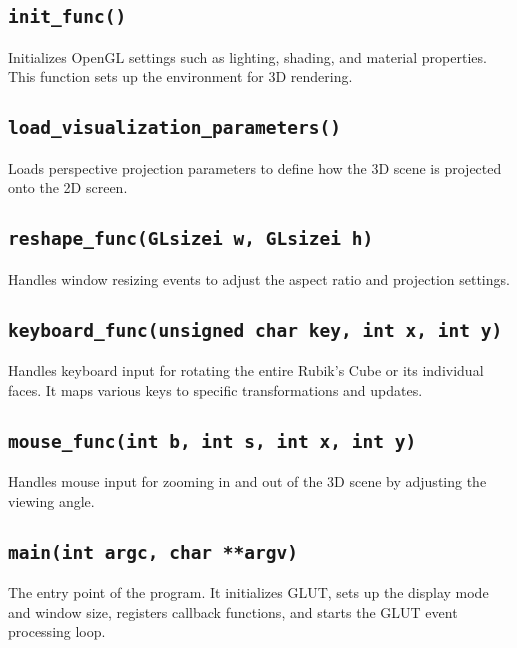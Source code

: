 \documentclass{article}
\begin{document}
\subsection{\texttt{init\_func()}}
Initializes OpenGL settings such as lighting, shading, and material properties. This function sets up the environment for 3D rendering.

\subsection{\texttt{load\_visualization\_parameters()}}
Loads perspective projection parameters to define how the 3D scene is projected onto the 2D screen.

\subsection{\texttt{reshape\_func(GLsizei w, GLsizei h)}}
Handles window resizing events to adjust the aspect ratio and projection settings.

\subsection{\texttt{keyboard\_func(unsigned char key, int x, int y)}}
Handles keyboard input for rotating the entire Rubik's Cube or its individual faces. It maps various keys to specific transformations and updates.

\subsection{\texttt{mouse\_func(int b, int s, int x, int y)}}
Handles mouse input for zooming in and out of the 3D scene by adjusting the viewing angle.

\subsection{\texttt{main(int argc, char **argv)}}
The entry point of the program. It initializes GLUT, sets up the display mode and window size, registers callback functions, and starts the GLUT event processing loop.
\end{document}
